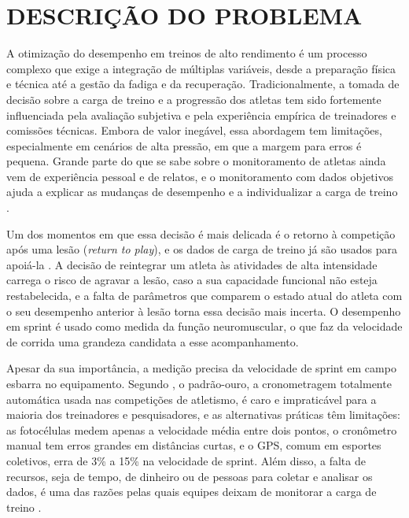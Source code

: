\documentclass[
    12pt,               %
    openright,          %
    twoside,            %
    a4paper,            %
    chapter=TITLE,      %
    english,            %
    brazil              %
    ]{abntex2}
\begin{document}
\section{DESCRIÇÃO DO PROBLEMA}

A otimização do desempenho em treinos de alto rendimento é um processo complexo que exige a integração de múltiplas variáveis, desde a preparação física e técnica até a gestão da fadiga e da recuperação. Tradicionalmente, a tomada de decisão sobre a carga de treino e a progressão dos atletas tem sido fortemente influenciada pela avaliação subjetiva e pela experiência empírica de treinadores e comissões técnicas. Embora de valor inegável, essa abordagem tem limitações, especialmente em cenários de alta pressão, em que a margem para erros é pequena. Grande parte do que se sabe sobre o monitoramento de atletas ainda vem de experiência pessoal e de relatos, e o monitoramento com dados objetivos ajuda a explicar as mudanças de desempenho e a individualizar a carga de treino \cite{halson2014monitoring}.

Um dos momentos em que essa decisão é mais delicada é o retorno à competição após uma lesão (\textit{return to play}), e os dados de carga de treino já são usados para apoiá-la \cite{bourdon2017monitoring}. A decisão de reintegrar um atleta às atividades de alta intensidade carrega o risco de agravar a lesão, caso a sua capacidade funcional não esteja restabelecida, e a falta de parâmetros que comparem o estado atual do atleta com o seu desempenho anterior à lesão torna essa decisão mais incerta. O desempenho em sprint é usado como medida da função neuromuscular, o que faz da velocidade de corrida uma grandeza candidata a esse acompanhamento.

Apesar da sua importância, a medição precisa da velocidade de sprint em campo esbarra no equipamento. Segundo , o padrão-ouro, a cronometragem totalmente automática usada nas competições de atletismo, é caro e impraticável para a maioria dos treinadores e pesquisadores, e as alternativas práticas têm limitações: as fotocélulas medem apenas a velocidade média entre dois pontos, o cronômetro manual tem erros grandes em distâncias curtas, e o GPS, comum em esportes coletivos, erra de 3\% a 15\% na velocidade de sprint. Além disso, a falta de recursos, seja de tempo, de dinheiro ou de pessoas para coletar e analisar os dados, é uma das razões pelas quais equipes deixam de monitorar a carga de treino \cite{halson2014monitoring}.
\end{document}
